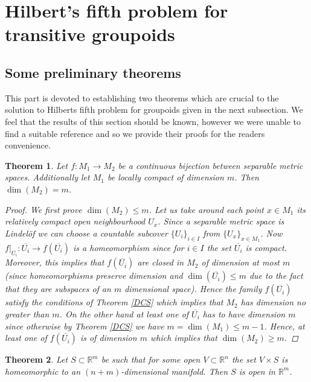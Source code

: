 \documentclass[11pt]{article}
\newtheorem{tw}{Theorem}[section]
\begin{document}
\section{Hilbert's fifth problem for transitive groupoids}
\subsection{Some preliminary theorems}
This part is devoted to establishing two theorems which are crucial to the solution to Hilberts fifth problem for groupoids given in the next subsection. We feel that the results of this section should be known, however we were unable to find a suitable reference and so we provide their proofs for the readers convenience.
\begin{tw}\label{dim} Let $f\colon M_1\rightarrow M_2$ be a continuous bijection between separable metric spaces. Additionally let $M_1$ be locally compact of dimension $m$. Then $\dim(M_2)=m$.
\begin{proof} We first prove $\dim(M_2)\leq m$. Let us take around each point $x\in M_1$ its relatively compact open neighbourhood $U_x$. Since a separable metric space is Lindel\"{o}f we can choose a countable subcover $\{U_i\}_{i\in I}$ from $\{U_x\}_{x\in M_1}$. Now $f|_{\overline{U_i}}\colon \overline{U_i}\rightarrow f(\overline{U_i})$ is a homeomorphism since for $i\in I$ the set $\overline{U_i}$ is compact. Moreover, this implies that $f(\overline{U_i})$ are closed in $M_2$ of dimension at most $m$ (since homeomorphisms preserve dimension and $\dim(\overline{U_i})\leq m$ due to the fact that they are subspaces of an $m$ dimensional space). Hence the family $f(\overline{U_i})$ satisfy the conditions of Theorem \ref{DCS} which implies that $M_2$ has dimension no greater than $m$. On the other hand at least one of $\overline{U_i}$ has to have dimension $m$ since otherwise by Theorem \ref{DCS} we have $m=\dim(M_1)\leq m-1$. Hence, at least one of $f(\overline{U_i})$ is of dimension $m$ which implies that $\dim(M_2)\geq m$.
\end{proof}
\end{tw}
\begin{tw}\label{Prod1} Let $S\subset\mathbb{R}^m$ be such that for some open $V\subset\mathbb{R}^n$ the set $V\times S$ is homeomorphic to an $(n+m)$-dimensional manifold. Then $S$ is open in $\mathbb{R}^m$.\end{tw}
\end{document}
